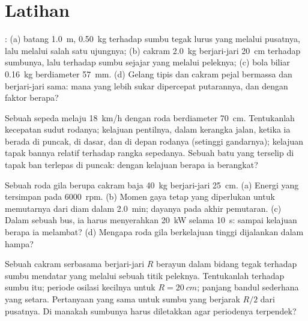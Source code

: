 \section{Latihan}

\begin{exercise}[$\star$]\label{exo:b2:rigid-body-mechanics:1}
: (a) batang \qty{1.0}{m}, \qty{0.50}{kg} terhadap sumbu
tegak lurus yang melalui pusatnya, lalu melalui salah satu ujungnya;
(b) cakram \qty{2.0}{kg} berjari-jari \qty{20}{cm} terhadap sumbunya,
lalu terhadap sumbu sejajar yang melalui peleknya; (c) bola biliar
\qty{0.16}{kg} berdiameter \qty{57}{mm}. (d) Gelang tipis dan cakram
pejal bermassa dan berjari-jari sama: mana yang lebih sukar dipercepat
putarannya, dan dengan faktor berapa?
\end{exercise}

\begin{exercise}[$\star$]\label{exo:b2:rigid-body-mechanics:2}
Sebuah sepeda melaju \qty{18}{km/h} dengan roda berdiameter \qty{70}{cm}.
Tentukanlah kecepatan sudut rodanya; kelajuan pentilnya, dalam kerangka
jalan, ketika ia berada di puncak, di dasar, dan di depan rodanya
(setinggi gandarnya); kelajuan tapak bannya relatif terhadap rangka
sepedanya. Sebuah batu yang terselip di tapak ban terlepas di puncak:
dengan kelajuan berapa ia berangkat?
\end{exercise}

\begin{exercise}[$\star$]\label{exo:b2:rigid-body-mechanics:3}
Sebuah roda gila berupa cakram baja \qty{40}{kg} berjari-jari \qty{25}{cm}.
(a) Energi yang tersimpan pada \qty{6000}{rpm}. (b) Momen gaya tetap yang
diperlukan untuk memutarnya dari diam dalam \qty{2.0}{min}; dayanya pada
akhir pemutaran. (c) Dalam sebuah bus, ia harus menyerahkan \qty{20}{kW}
selama \qty{10}{s}: sampai kelajuan berapa ia melambat? (d) Mengapa roda
gila berkelajuan tinggi dijalankan dalam hampa?
\end{exercise}

\begin{exercise}[$\star$]\label{exo:b2:rigid-body-mechanics:4}
Sebuah cakram serbasama berjari-jari $R$ berayun dalam bidang tegak
terhadap sumbu mendatar yang melalui sebuah titik peleknya. Tentukanlah
 terhadap sumbu itu; periode osilasi kecilnya untuk
$R = \qty{20}{cm}$; panjang bandul sederhana yang setara. Pertanyaan yang
sama untuk sumbu yang berjarak $R/2$ dari pusatnya. Di manakah sumbunya
harus diletakkan agar periodenya terpendek?
\end{exercise}

